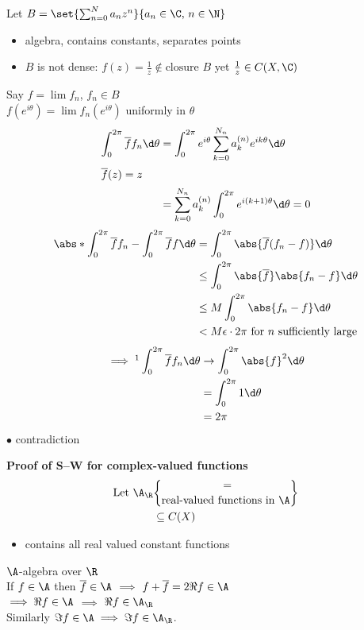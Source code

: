 Let $B=\set{\sum_{n=0}^N a_n z^n}{a_n\in\C\text{, }n\in\N}$
\begin{itemize}
\item algebra, contains constants, separates points
\item $B$ is not dense: $f(z)=\frac{1}{z}\notin\text{closure $B$}$ yet $\frac1z\in C(X,\C)$
\end{itemize}
Say $f=\lim f_n$, $f_n\in B$ \\
$f(e^{i\theta})=\lim f_n(e^{i\theta})$ uniformly in $\theta$
\begin{align*}
\int_0^{2\pi} \overline f f_n \d\theta &= \int_0^{2\pi} e^{i\theta} \sum_{k=0}^{N_n} a_k^{(n)}e^{ik\theta} \d\theta \\ \intertext{$\overline f(z)=z$}
&= \sum_{k=0}^{N_n} a_k^{(n)} \int_0^{2\pi} e^{i(k+1)\theta} \d\theta = 0
\end{align*}
\begin{align*}
\abs*{\int_0^{2\pi} \overline f f_n - \int_0^{2\pi} \overline f f \d\theta} &= \int_0^{2\pi} \abs{\overline f (f_n-f)}\d\theta \\
&\leq \int_0^{2\pi} \abs{\overline f}\abs{f_n-f}\d\theta \\
&\leq M \int_0^{2\pi} \abs{f_n-f}\d\theta \\
&< M\epsilon\cdot2\pi\text{ for $n$ sufficiently large}
\end{align*}
\begin{align*}
\implies \footnotemark\int_0^{2\pi} \overline f f_n \d\theta &\to \int_0^{2\pi} \abs{f}^2\d\theta \\
&= \int_0^{2\pi} 1 \d\theta \\
&= 2\pi
\end{align*}%
$\bullet$ contradiction

\textbf{Proof of S--W for complex-valued functions} %
\begin{align*}
\text{Let } \A_\R &= \brace{\text{real-valued functions in $\A$}} \\
&\subseteq C(X)
\end{align*}
\begin{itemize}
\item contains all real valued constant functions
\end{itemize}
$\A$-algebra over $\R$ \\
If $f\in\A$ then $\overline f\in\A$ $\implies$ $f+\overline f=2\Re f\in\A$ \\
$\implies \Re f\in\A$ $\implies$ $\Re f\in\A_\R$ \\
Similarly $\Im f\in\A\implies\Im f\in\A_\R$.

